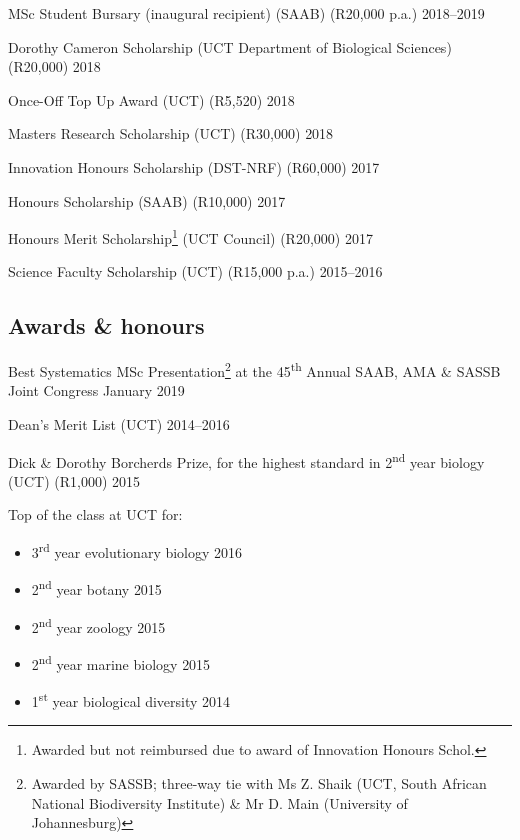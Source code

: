 \documentclass[10pt]{article}
\begin{document}
MSc Student Bursary (inaugural recipient) (SAAB) (R20,000 p.a.)
                                                      \hfill {\small 2018--2019}

Dorothy Cameron Scholarship (UCT Department of Biological Sciences) (R20,000)
                                                            \hfill {\small 2018}

Once-Off Top Up Award (UCT) (R5,520)                        \hfill {\small 2018}

Masters Research Scholarship (UCT) (R30,000)                \hfill {\small 2018}

Innovation Honours Scholarship (DST-NRF) (R60,000)          \hfill {\small 2017}

Honours Scholarship (SAAB) (R10,000)                        \hfill {\small 2017}

Honours Merit Scholarship\footnote{Awarded but not reimbursed due to award of 
Innovation Honours Schol.} (UCT Council) (R20,000)          \hfill {\small 2017}

Science Faculty Scholarship (UCT) (R15,000 p.a.)      \hfill {\small 2015--2016}

\subsection*{Awards \& honours}

Best Systematics MSc Presentation\footnote{Awarded by SASSB; three-way tie with 
Ms Z. Shaik (UCT, South African National Biodiversity Institute) \& Mr D. Main
(University of Johannesburg)} at the 45\textsuperscript{th} Annual SAAB, AMA \&
SASSB Joint Congress                                \hfill {\small January 2019}

Dean's Merit List (UCT)                               \hfill {\small 2014--2016}

Dick \& Dorothy Borcherds Prize, for the highest standard in 
2\textsuperscript{nd} year biology (UCT) (R1,000)           \hfill {\small 2015}

Top of the class at UCT for:

\begin{itemize}[noitemsep, nolistsep]
  \item 3\textsuperscript{rd} year evolutionary biology     \hfill {\small 2016}
  \item 2\textsuperscript{nd} year botany                   \hfill {\small 2015}
  \item 2\textsuperscript{nd} year zoology                  \hfill {\small 2015}
  \item 2\textsuperscript{nd} year marine biology           \hfill {\small 2015}
  \item 1\textsuperscript{st} year biological diversity     \hfill {\small 2014}
\end{itemize}
\end{document}
